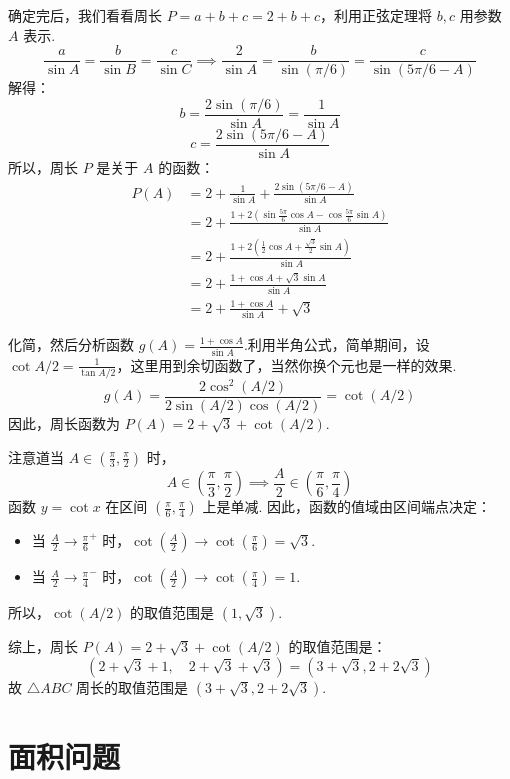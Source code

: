\begin{solution}
	确定完后，我们看看周长 $P = a+b+c = 2+b+c$，利用正弦定理将 $b,c$ 用参数 $A$ 表示.
	\[
	\frac{a}{\sin A} = \frac{b}{\sin B} = \frac{c}{\sin C} \implies \frac{2}{\sin A} = \frac{b}{\sin(\pi/6)} = \frac{c}{\sin(5\pi/6 - A)}
	\]
	解得：
	\[
	b = \frac{2\sin(\pi/6)}{\sin A} = \frac{1}{\sin A}
	\]
	\[
	c = \frac{2\sin(5\pi/6 - A)}{\sin A}
	\]
	所以，周长 $P$ 是关于 $A$ 的函数：
	\begin{align*}
		P(A) &= 2 + \frac{1}{\sin A} + \frac{2\sin(5\pi/6 - A)}{\sin A} \\
		&= 2 + \frac{1 + 2\left(\sin\frac{5\pi}{6}\cos A - \cos\frac{5\pi}{6}\sin A\right)}{\sin A} \\
		&= 2 + \frac{1 + 2\left(\frac{1}{2}\cos A + \frac{\sqrt{3}}{2}\sin A\right)}{\sin A} \\
		&= 2 + \frac{1 + \cos A + \sqrt{3}\sin A}{\sin A} \\
		&= 2 + \frac{1+\cos A}{\sin A} + \sqrt{3}
	\end{align*}
	
	化简，然后分析函数 $g(A) = \frac{1+\cos A}{\sin A}$.利用半角公式，简单期间，设$\cot A/2 = \frac{1}{\tan A/2}$，这里用到余切函数了，当然你换个元也是一样的效果.
	\[
	g(A) = \frac{2\cos^2(A/2)}{2\sin(A/2)\cos(A/2)} = \cot(A/2)
	\]
	因此，周长函数为 $P(A) = 2 + \sqrt{3} + \cot(A/2)$.
	
	注意道当 $A \in (\frac{\pi}{3}, \frac{\pi}{2})$ 时，
	\[
	A \in \left(\frac{\pi}{3}, \frac{\pi}{2}\right) \implies \frac{A}{2} \in \left(\frac{\pi}{6}, \frac{\pi}{4}\right)
	\]
	函数 $y = \cot x$ 在区间 $(\frac{\pi}{6}, \frac{\pi}{4})$ 上是单减.
	因此，函数的值域由区间端点决定：
	\begin{itemize}
		\item 当 $\frac{A}{2} \to \frac{\pi}{6}^+$ 时，$\cot(\frac{A}{2}) \to \cot(\frac{\pi}{6}) = \sqrt{3}$.
		\item 当 $\frac{A}{2} \to \frac{\pi}{4}^-$ 时，$\cot(\frac{A}{2}) \to \cot(\frac{\pi}{4}) = 1$.
	\end{itemize}
	所以，$\cot(A/2)$ 的取值范围是 $(1, \sqrt{3})$.
	
	综上，周长 $P(A) = 2+\sqrt{3} + \cot(A/2)$ 的取值范围是：
	\[
	\left(2+\sqrt{3} + 1, \quad 2+\sqrt{3} + \sqrt{3}\right) = \left(3+\sqrt{3}, 2+2\sqrt{3}\right)
	\]
	故 $\triangle ABC$ 周长的取值范围是 $(3+\sqrt{3}, 2+2\sqrt{3})$.\hfill\qedsymbol
\end{solution}

\section{面积问题}

